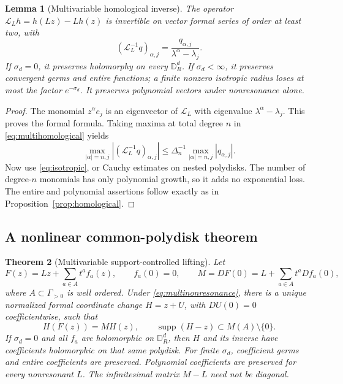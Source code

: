 \documentclass[11pt,a4paper]{article}
\numberwithin{equation}{section}
\newtheorem{theorem}{Theorem}[section]
\newtheorem{lemma}[theorem]{Lemma}
\theoremstyle{definition}
\theoremstyle{remark}
\newcommand{\LL}{\mathcal L}
\newcommand{\supp}{\operatorname{supp}}
\begin{document}
\begin{lemma}[Multivariable homological inverse]\label{lem:multihomological}
The operator $\LL_Lh=h(Lz)-Lh(z)$ is invertible on vector formal series
of order at least two, with
\begin{equation}\label{eq:multihomological}
 (\LL_L^{-1}q)_{\alpha,j}
       =\frac{q_{\alpha,j}}{\lambda^\alpha-\lambda_j}.
\end{equation}
If $\sigma_d=0$, it preserves holomorphy on every
$\mathbb D_R^d$. If $\sigma_d<\infty$, it preserves convergent germs and
entire functions; a finite nonzero isotropic radius loses at most the
factor $e^{-\sigma_d}$. It preserves polynomial vectors under
nonresonance alone.
\end{lemma}

\begin{proof}
The monomial $z^\alpha e_j$ is an eigenvector of $\LL_L$ with eigenvalue
$\lambda^\alpha-\lambda_j$. This proves the formal formula.
Taking maxima at total degree $n$ in \eqref{eq:multihomological} yields
\[
 \max_{|\alpha|=n,j}|(\LL_L^{-1}q)_{\alpha,j}|
 \le\Delta_n^{-1}\max_{|\alpha|=n,j}|q_{\alpha,j}|.
\]
Now use \eqref{eq:isotropic}, or Cauchy estimates on nested polydisks.
The number of degree-$n$ monomials has only polynomial growth, so it adds
no exponential loss. The entire and polynomial assertions follow exactly
as in Proposition~\ref{prop:homological}.
\end{proof}

\subsection{A nonlinear common-polydisk theorem}

\begin{theorem}[Multivariable support-controlled lifting]\label{thm:multilifting}
Let
\[
 F(z)=Lz+\sum_{a\in A}t^a f_a(z),\qquad f_a(0)=0,
 \qquad M=DF(0)=L+\sum_{a\in A}t^a Df_a(0),
\]
where $A\subset\Gamma_{>0}$ is well ordered. Under
\eqref{eq:multinonresonance}, there is a unique normalized formal
coordinate change $H=z+U$, with $DU(0)=0$ coefficientwise, such that
\begin{equation}\label{eq:multischroeder}
 H(F(z))=M H(z),\qquad
 \supp(H-z)\subset M(A)\setminus\{0\}.
\end{equation}
If $\sigma_d=0$ and all $f_a$ are holomorphic on $\mathbb D_R^d$, then
$H$ and its inverse have coefficients holomorphic on that same polydisk.
For finite $\sigma_d$, coefficient germs and entire coefficients are
preserved. Polynomial coefficients are preserved for every nonresonant
$L$. The infinitesimal matrix $M-L$ need not be diagonal.
\end{theorem}
\end{document}

